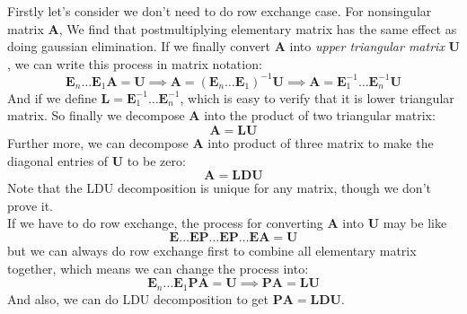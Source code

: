 \begin{itemize}
Firstly let's consider we don't need to do row exchange case. For nonsingular matrix $\bm A$, We find that postmultiplying elementary matrix has the same effect as doing gaussian elimination. If we finally convert $\bm A$ into \textit{upper triangular matrix} $\bm U$, we can write this process in matrix notation:
\[
\bm E_n \ldots \bm E_1\bm A = \bm U\implies \bm A = (\bm E_n \ldots \bm E_1)^{-1}\bm U
\implies \bm A = \bm E_1^{-1} \ldots \bm E_n^{-1}\bm U
\]
And if we define $\bm L = \bm E_1^{-1} \ldots \bm E_n^{-1}$, which is easy to verify that it is lower triangular matrix. So finally we decompose $\bm A$ into the product of two triangular matrix:
\[
\bm A = \bm L\bm U
\]
Further more, we can decompose $\bm A$ into product of three matrix to make the diagonal entries of $\bm U$ to be zero:
\[
\bm A = \bm L\bm D\bm U
\]
Note that the LDU decomposition is unique for any matrix, though we don't prove it.\\
If we have to do row exchange, the process for converting $\bm A$ into $\bm U$ may be like 
\[\bm E\ldots \bm E\bm P\ldots \bm E\bm P \ldots \bm E\bm A = \bm U\] but we can always do row exchange first to combine all elementary matrix together, which means we can change the process into:
\[
\bm E_n \ldots \bm E_1\bm P\bm A = \bm U\implies \bm P\bm A = \bm L\bm U
\]
And also, we can do LDU decomposition to get $ \bm P\bm A = \bm L\bm D\bm U$.
\end{itemize}
